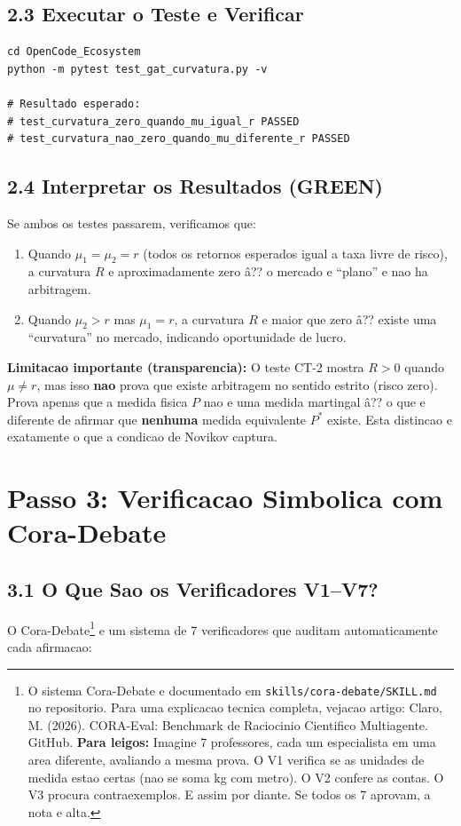 \subsection{2.3 Executar o Teste e Verificar}

\begin{lstlisting}[caption={Executar TDD \^a?? RED (deve falhar)}, label=lst:run1]
cd OpenCode_Ecosystem
python -m pytest test_gat_curvatura.py -v

# Resultado esperado:
# test_curvatura_zero_quando_mu_igual_r PASSED
# test_curvatura_nao_zero_quando_mu_diferente_r PASSED
\end{lstlisting}

\subsection{2.4 Interpretar os Resultados (GREEN)}

Se ambos os testes passarem, verificamos que:

\begin{enumerate}[nosep]
 \item Quando $\mu_1 = \mu_2 = r$ (todos os retornos esperados igual a taxa
 livre de risco), a curvatura $R$ e aproximadamente zero \^a?? o mercado e
 ``plano'' e nao ha arbitragem.
 \item Quando $\mu_2 > r$ mas $\mu_1 = r$, a curvatura $R$ e maior que zero
 \^a?? existe uma ``curvatura'' no mercado, indicando oportunidade de
 lucro.
\end{enumerate}

\textbf{Limitacao importante (transparencia):} O teste CT-2 mostra $R > 0$
quando $\mu \neq r$, mas isso \textbf{nao} prova que existe arbitragem no
sentido estrito (risco zero). Prova apenas que a medida fisica $P$ nao e
uma medida martingal \^a?? o que e diferente de afirmar que \textbf{nenhuma}
medida equivalente $P^*$ existe. Esta distincao e exatamente o que a
condicao de Novikov captura.

\section{Passo 3: Verificacao Simbolica com Cora-Debate}

\subsection{3.1 O Que Sao os Verificadores V1--V7?}

O Cora-Debate\footnote{O sistema Cora-Debate e documentado em
\texttt{skills/cora-debate/SKILL.md} no repositorio. Para uma explicacao
tecnica completa, vejacao artigo: Claro, M. (2026). CORA-Eval: Benchmark
de Raciocinio Cientifico Multiagente. GitHub. \textbf{Para leigos:}
Imagine 7 professores, cada um especialista em uma area diferente,
avaliando a mesma prova. O V1 verifica se as unidades de medida estao
certas (nao se soma kg com metro). O V2 confere as contas. O V3 procura
contraexemplos. E assim por diante. Se todos os 7 aprovam, a nota e alta.}
e um sistema de 7 verificadores que auditam automaticamente cada afirmacao:


